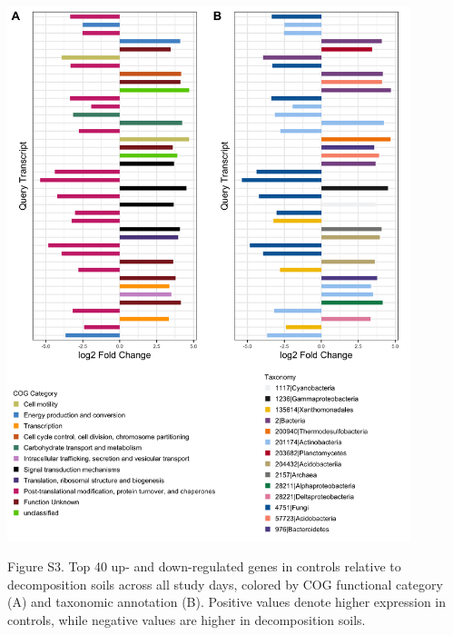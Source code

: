 \documentclass[
  letterpaper,
  DIV=11,
  numbers=noendperiod]{scrartcl}
\begin{document}
\pagebreak

\includegraphics[width=0.88\textwidth]{../../figures/Trt_DE_top20_barplot.png}

Figure S3. Top 40 up- and down-regulated genes in controls relative to
decomposition soils across all study days, colored by COG functional
category (A) and taxonomic annotation (B). Positive values denote higher
expression in controls, while negative values are higher in
decomposition soils.

\pagebreak
\end{document}
